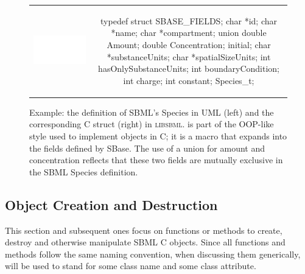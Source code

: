 \documentclass{sbmlmanual}
\newcommand{\libsbml}{\textsc{libsbml}}
\begin{document}
\begin{figure}[bht]
  \begin{tabular}{m{8.5cm}c}
    \includegraphics[scale=0.68]{species}
    &
    \begin{example}[c]
typedef struct
{
  SBASE_FIELDS;
  char   *id;
  char   *name;
  char   *compartment;
  union
  {
    double Amount;
    double Concentration;
  } initial;
  char   *substanceUnits;
  char   *spatialSizeUnits;
  int     hasOnlySubstanceUnits;
  int     boundaryCondition;
  int     charge;
  int     constant;
} Species_t;
    \end{example}\\
  \end{tabular}
  \caption{Example: the definition of SBML's Species in UML (left) and the
    corresponding  C struct (right) in \libsbml{}.
     is part of the OOP-like style used to implement
    objects in C; it is a macro that expands into the fields defined by
    SBase.  The use of a union for amount and concentration reflects that
    these two fields are mutually exclusive in the SBML Species
    definition.}
  \label{fig:species-uml-and-c}
\end{figure}



\subsection{Object Creation and Destruction}

This section and subsequent ones focus on functions or methods to
create, destroy and otherwise manipulate SBML C objects.  Since all
functions and methods follow the same naming convention, when
discussing them generically,  will be used to stand for
some class name and  some class attribute.
\end{document}
